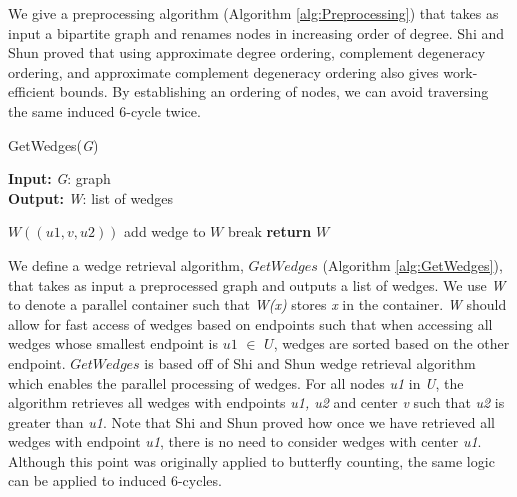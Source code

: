 \documentclass[11pt]{article}
\begin{document}
We give a preprocessing algorithm (Algorithm \ref{alg:Preprocessing}) that takes as input a bipartite graph and renames nodes in increasing order of degree.
Shi and Shun \cite{shi2019parallel} proved that using approximate degree ordering, complement degeneracy ordering, and approximate complement degeneracy ordering also gives work-efficient bounds.
By establishing an ordering of nodes, we can avoid traversing the same induced 6-cycle twice.

\begin{algorithm}[H]
\caption{GetWedges(\textit{G})}
\label{alg:GetWedges}
\hspace*{\algorithmicindent} \textbf{Input:} \textit{G}: graph \\
\hspace*{\algorithmicindent} \textbf{Output:} \textit{W}: list of wedges
\begin{algorithmic}[1]
                    \State $W((u1, v, u2))$ \Comment add wedge to $W$
                \Else
                    \State break
                \EndIf
            \EndFor
        \EndFor
    \EndFor
    \State \textbf{return} $W$
\end{algorithmic}
\end{algorithm}

We define a wedge retrieval algorithm, $GetWedges$ (Algorithm \ref{alg:GetWedges}), that takes as input a preprocessed graph and outputs a list of wedges.
We use \textit{W} to denote a parallel container such that \textit{W(x)} stores \textit{x} in the container.
\textit{W} should allow for fast access of wedges based on endpoints such that when accessing all wedges whose smallest endpoint is $u1$ $\in$ $U$, wedges are sorted based on the other endpoint.
$GetWedges$ is based off of Shi and Shun \cite{shi2019parallel} wedge retrieval algorithm which enables the parallel processing of wedges.
For all nodes \textit{u1} in \textit{U}, the algorithm retrieves all wedges with endpoints \textit{u1, u2} and center \textit{v} such that \textit{u2} is greater than \textit{u1}.
Note that Shi and Shun proved how once we have retrieved all wedges with endpoint \textit{u1}, there is no need to consider wedges with center \textit{u1}.
Although this point was originally applied to butterfly counting, the same logic can be applied to induced 6-cycles.
\end{document}
